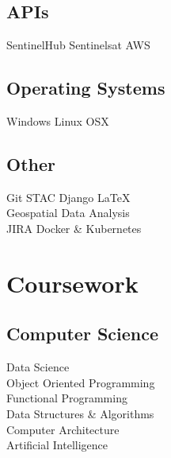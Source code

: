 \documentclass[letterpaper]{resume_AMcEnaney} %
\begin{document}
\begin{minipage}[t]{0.33\textwidth}
        \sectionspace

    \subsection{APIs}

        \textbullet{} SentinelHub \textbullet{} Sentinelsat \textbullet{} AWS
        
        \sectionspace

    \subsection{Operating Systems}
        \textbullet{} Windows \textbullet{} Linux \textbullet{} OSX
        
        \sectionspace

    \subsection{Other}
        \textbullet{} Git \textbullet{} STAC \textbullet{} Django \textbullet{} \LaTeX \\ \textbullet{} Geospatial Data Analysis \\ 
        \textbullet{} JIRA \textbullet{} Docker \& Kubernetes

    \sectionspace %


\section{Coursework}


    \subsection{Computer Science}

        \textbullet{} Data Science \\
        \textbullet{} Object Oriented Programming \\
        \textbullet{} Functional Programming \\
        \textbullet{} Data Structures \& Algorithms \\
        \textbullet{} Computer Architecture \\
        \textbullet{} Artificial Intelligence \\
        

\end{minipage}
\end{document}
